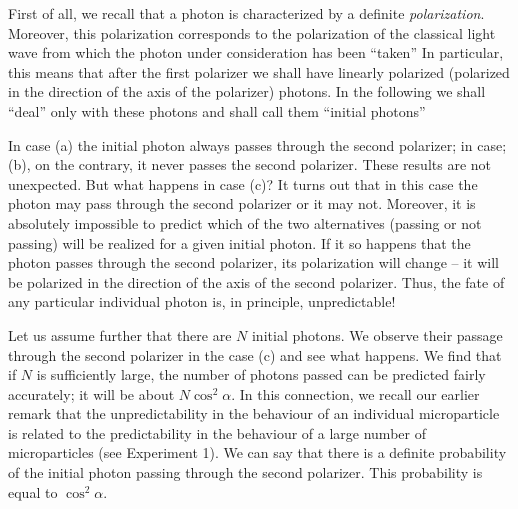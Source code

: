 \documentclass[a4paper,sfsidenotes,colorlinks=true]{tufte-book}
\numberwithin{equation}{section}
\numberwithin{figure}{section}
\begin{document}
First of all, we recall that a photon is characterized by a definite \emph{polarization}. Moreover, this polarization corresponds to the polarization of the classical light wave from which the photon under consideration has been ``taken'' In particular, this means that after the first polarizer we shall have linearly polarized (polarized in the direction of the axis of the polarizer) photons. In the following we shall ``deal'' only with these photons and shall call them ``initial photons''


In case (a) the initial photon always passes through the second polarizer; in case; (b), on the contrary, it never passes the second polarizer. These results are not unexpected. But what happens in case (c)? It turns out that in this case the photon may pass through the second polarizer or it may not. Moreover, it is absolutely impossible to predict which of the two alternatives (passing or not passing) will be realized for a given initial photon. If it so happens that the photon passes through the second polarizer, its polarization will change -- it will be polarized in the direction of the axis of the second polarizer. Thus, the fate of any particular individual photon is, in principle, unpredictable!


Let us assume further that there are $N$ initial photons. We observe their passage through the second polarizer in the case (c) and see what happens. We find that if $N$ is sufficiently large, the number of photons passed can be predicted fairly accurately; it will be about $N \cos^{2} \alpha$. In this connection, we recall our earlier remark that the unpredictability in the behaviour of an individual microparticle is related to the predictability in the behaviour of a large number of microparticles (see Experiment 1). We can say that there is a definite probability of the initial photon passing through the second polarizer. This
probability is equal to  $\cos^{2} \alpha$. 
\end{document}
